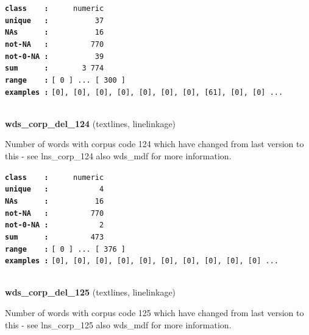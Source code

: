 \documentclass[]{article}
\begin{document}
\textbf{\texttt{class\ \ \ \ :}} \texttt{~~~~~numeric}\\
\textbf{\texttt{unique\ \ \ :}} \texttt{~~~~~~~~~~37}\\
\textbf{\texttt{NAs\ \ \ \ \ \ :}} \texttt{~~~~~~~~~~16}\\
\textbf{\texttt{not-NA\ \ \ :}} \texttt{~~~~~~~~~770}\\
\textbf{\texttt{not-0-NA\ :}} \texttt{~~~~~~~~~~39}\\
\textbf{\texttt{sum\ \ \ \ \ \ :}} \texttt{~~~~~~~3~774}\\
\textbf{\texttt{range\ \ \ \ :}}
\texttt{{[}\ 0\ {]}\ ...\ {[}\ 300\ {]}}\\
\textbf{\texttt{examples\ :}}
\texttt{{[}0{]},\ {[}0{]},\ {[}0{]},\ {[}0{]},\ {[}0{]},\ {[}0{]},\ {[}0{]},\ {[}61{]},\ {[}0{]},\ {[}0{]}\ ...}\\

~

\textbf{wds\_corp\_del\_124} (textlines, linelinkage)

Number of words with corpus code 124 which have changed from last
version to this - see lns\_corp\_124 also wds\_mdf for more information.

\textbf{\texttt{class\ \ \ \ :}} \texttt{~~~~~numeric}\\
\textbf{\texttt{unique\ \ \ :}} \texttt{~~~~~~~~~~~4}\\
\textbf{\texttt{NAs\ \ \ \ \ \ :}} \texttt{~~~~~~~~~~16}\\
\textbf{\texttt{not-NA\ \ \ :}} \texttt{~~~~~~~~~770}\\
\textbf{\texttt{not-0-NA\ :}} \texttt{~~~~~~~~~~~2}\\
\textbf{\texttt{sum\ \ \ \ \ \ :}} \texttt{~~~~~~~~~473}\\
\textbf{\texttt{range\ \ \ \ :}}
\texttt{{[}\ 0\ {]}\ ...\ {[}\ 376\ {]}}\\
\textbf{\texttt{examples\ :}}
\texttt{{[}0{]},\ {[}0{]},\ {[}0{]},\ {[}0{]},\ {[}0{]},\ {[}0{]},\ {[}0{]},\ {[}0{]},\ {[}0{]},\ {[}0{]}\ ...}\\

~

\textbf{wds\_corp\_del\_125} (textlines, linelinkage)

Number of words with corpus code 125 which have changed from last
version to this - see lns\_corp\_125 also wds\_mdf for more information.
\end{document}
